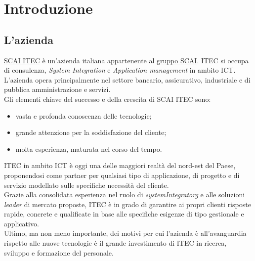 
\chapter{Introduzione}
\label{cap:introduzione}





\section{L'azienda}

\href{https://scaiitec.it/}{SCAI ITEC} è un'azienda italiana appartenente al \href{https://www.grupposcai.it/}{gruppo SCAI}. ITEC si occupa di consulenza, \textit{System Integration} e \textit{Application management} in ambito ICT. L'azienda opera principalmente nel settore bancario, assicurativo, industriale e di pubblica amministrazione e servizi. \\Gli elementi chiave del successo e della crescita di SCAI ITEC sono:
\begin{itemize}
    \item vasta e profonda conoscenza delle tecnologie;
    \item grande attenzione per la soddisfazione del cliente;
    \item molta esperienza, maturata nel corso del tempo.
\end{itemize} 
ITEC in ambito ICT è oggi una delle maggiori realtà del nord-est del Paese, proponendosi come partner per qualsiasi tipo di applicazione, di progetto e di servizio modellato sulle specifiche necessità del cliente. 
\\Grazie alla consolidata esperienza nel ruolo di \textit{\gls{systemIntegratorg}\glsfirstoccur{}} e alle soluzioni \textit{leader} di mercato proposte, ITEC è in grado di garantire ai propri clienti risposte rapide, concrete e qualificate in base alle specifiche esigenze di tipo gestionale e applicativo.
\\Ultimo, ma non meno importante, dei motivi per cui l'azienda è all'avanguardia rispetto alle nuove tecnologie è il grande investimento di ITEC in ricerca, sviluppo e formazione del personale.

